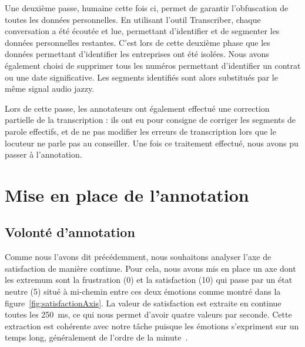 Une deuxième passe, humaine cette fois ci, permet de garantir l'obfuscation de toutes les données personnelles. En utilisant l'outil Transcriber, chaque conversation a été écoutée et lue, permettant d'identifier et de segmenter les données personnelles restantes. C'est lors de cette deuxième phase que les données permettant d'identifier les entreprises ont été isolées. Nous avons également choisi de supprimer tous les numéros permettant d'identifier un contrat ou une date significative. Les segments identifiés sont alors substitués par le même signal audio jazzy.

Lors de cette passe, les annotateurs ont également effectué une correction partielle de la transcription : ils ont eu pour consigne de corriger les segments de parole effectifs, et de ne pas modifier les erreurs de transcription lors que le locuteur ne parle pas au conseiller. Une fois ce traitement effectué, nous avons pu passer à l'annotation.

\section{Mise en place de l'annotation}

\subsection{Volonté d'annotation}
Comme nous l'avons dit précédemment, nous souhaitons analyser l'axe de satisfaction de manière continue. Pour cela, nous avons mis en place un axe dont les extremum sont la frustration (0) et la satisfaction (10) qui passe par un état neutre (5) situé à mi-chemin entre ces deux émotions comme montré dans la figure~\ref{fig:satisfactionAxis}. La valeur de satisfaction est extraite en continue toutes les 250~ms, ce qui nous permet d'avoir quatre valeurs par seconde. Cette extraction est cohérente avec notre tâche puisque les émotions s'expriment sur un temps long, généralement de l'ordre de la minute~\cite{Schuller2010}.

